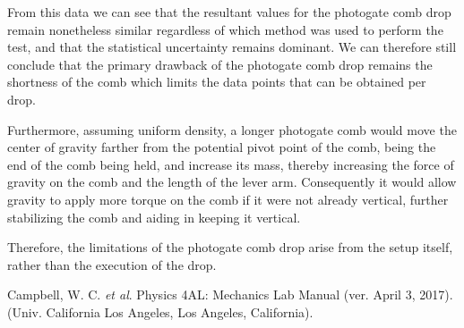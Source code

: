 \documentclass[titlepage]{article}
\begin{document}
From this data we can see that the resultant values for the photogate comb drop remain nonetheless similar regardless of which method was used to perform the test, and that the statistical uncertainty remains dominant. We can therefore still conclude that the primary drawback of the photogate comb drop remains the shortness of the comb which limits the data points that can be obtained per drop.

Furthermore, assuming uniform density, a longer photogate comb would move the center of gravity farther from the potential pivot point of the comb, being the end of the comb being held, and increase its mass, thereby increasing the force of gravity on the comb and the length of the lever arm. Consequently it would allow gravity to apply more torque on the comb if it were not already vertical, further stabilizing the comb and aiding in keeping it vertical.

Therefore, the limitations of the photogate comb drop arise from the setup itself, rather than the execution of the drop.

\pagebreak

\begin{thebibliography}{1}
Campbell, W. C. \textit{et al}. Physics 4AL: Mechanics Lab Manual (ver. April 3, 2017).
(Univ. California Los Angeles, Los Angeles, California).
\end{thebibliography}
\end{document}
